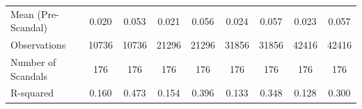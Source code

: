 {\begin{tabular}{l*{8}{c}}
Mean (Pre-Scandal)&       0.020         &       0.053         &       0.021         &       0.056         &       0.024         &       0.057         &       0.023         &       0.057         \\
Observations&       10736         &       10736         &       21296         &       21296         &       31856         &       31856         &       42416         &       42416         \\
Number of Scandals&         176         &         176         &         176         &         176         &         176         &         176         &         176         &         176         \\
R-squared   &       0.160         &       0.473         &       0.154         &       0.396         &       0.133         &       0.348         &       0.128         &       0.300         \\
\bottomrule
\end{tabular}
}
